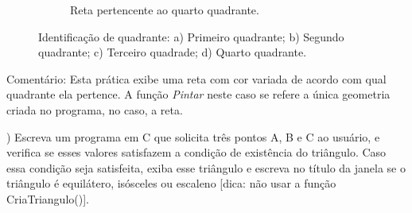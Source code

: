 \begin{renumerate}
\begin{figure}[h!]
\begin{subfigure}[t]{0.2\textwidth}
        \caption{Reta pertencente ao quarto quadrante.}
        \label{fig:cap01_ex4d}
    \end{subfigure}
    \caption{Identificação de quadrante: a) Primeiro quadrante; b) Segundo quadrante; c) Terceiro quadrade; d) Quarto quadrante.}
\end{figure}

  Comentário: Esta prática exibe uma reta com cor variada de acordo com qual quadrante ela pertence. A função \emph{Pintar} neste caso se refere a única geometria criada no programa, no caso, a reta.
%

\item)
Escreva um programa em C que solicita três pontos A, B e C ao usuário, e verifica se esses valores satisfazem a condição de existência do triângulo. Caso essa condição seja satisfeita, exiba esse triângulo e escreva no título da janela se o triângulo é equilátero, isósceles ou escaleno [dica: não usar a função CriaTriangulo()].


\end{renumerate}
